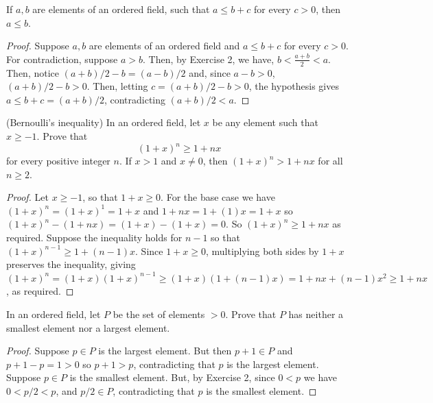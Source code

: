 \begin{tcolorbox}[title=Problem 10, breakable]
    If $a, b$ are elements of an ordered field, such that 
    $a \le b + c$ for every $c > 0$, then $a \le b$.
\end{tcolorbox}

\begin{proof}
    Suppose $a, b$ are elements of an ordered field and $a \le b + c$
        for every $c > 0$.
    For contradiction, suppose $a > b$.
    Then, by Exercise 2, we have, $b < \frac{a + b}{2} < a$.
    Then, notice $(a + b)/2 - b = (a - b)/2$ and, since $a - b > 0$, $(a + b)/2 - b > 0$.
    Then, letting $c = (a+b)/2 - b > 0$, the hypothesis gives $a \le b + c = (a+b)/2$,
        contradicting $(a+b)/2 < a$.
\end{proof}


\begin{tcolorbox}[title=Problem 13, breakable]
    (Bernoulli's inequality) In an ordered field, let $x$ be any element such that 
    $x \ge -1$. Prove that 
    \[(1 + x)^n \ge 1 + nx\]
    for every positive integer $n$.
    If $x > 1$ and $x \ne 0$, then $(1 + x)^n > 1 + nx$ for all $n \ge 2$.
\end{tcolorbox}

\begin{proof}
    Let $x \ge -1$, so that $1 + x \ge 0$.
    For the base case we have $(1 + x)^n = (1 + x)^1 = 1 + x$
        and $1 + nx = 1 + (1)x = 1 + x$ so $(1 + x)^n - (1 + nx) = (1 + x) - (1 + x) = 0$.
    So $(1 + x)^n \ge 1 + nx$ as required.
    Suppose the inequality holds for $n - 1$
        so that $(1 + x)^{n - 1} \ge 1 + (n - 1)x$.
    Since $1 + x \ge 0$, multiplying both sides by $1 + x$ preserves the inequality, giving
        $(1+x)^n = (1+x)(1+x)^{n-1} \ge (1+x)(1+(n-1)x) = 1 + nx + (n-1)x^2 \ge 1 + nx$,
        as required.
\end{proof}


\begin{tcolorbox}[title=Problem 18, breakable]
    In an ordered field, let $P$ be the set of elements $> 0$.
    Prove that $P$ has neither a smallest element nor a largest element.
\end{tcolorbox}

\begin{proof}
    Suppose $p \in P$ is the largest element.
    But then $p + 1 \in P$ and $p + 1 - p = 1 > 0$
        so $p + 1 > p$, contradicting that $p$ is the largest element.
    Suppose $p \in P$ is the smallest element.
    But, by Exercise 2, since $0 < p$ we have $0 < p/2 < p$,
        and $p/2 \in P$, contradicting that $p$ is the smallest element.
\end{proof}

